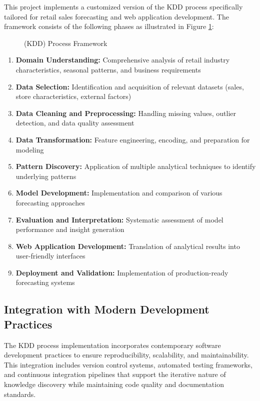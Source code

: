 This project implements a customized version of the KDD process specifically tailored for retail sales forecasting and web application development. The framework consists of the following phases as illustrated in Figure \ref{fig:kdd_process}:

\begin{figure}[H]
	\centering
	
	\caption{ (KDD) Process Framework}
	\label{fig:kdd_process}
\end{figure}

\begin{enumerate}
	\item \textbf{Domain Understanding:} Comprehensive analysis of retail industry characteristics, seasonal patterns, and business requirements
	\item \textbf{Data Selection:} Identification and acquisition of relevant datasets (sales, store characteristics, external factors)
	\item \textbf{Data Cleaning and Preprocessing:} Handling missing values, outlier detection, and data quality assessment
	\item \textbf{Data Transformation:} Feature engineering, encoding, and preparation for modeling
	\item \textbf{Pattern Discovery:} Application of multiple analytical techniques to identify underlying patterns
	\item \textbf{Model Development:} Implementation and comparison of various forecasting approaches
	\item \textbf{Evaluation and Interpretation:} Systematic assessment of model performance and insight generation
	\item \textbf{Web Application Development:} Translation of analytical results into user-friendly interfaces
	\item \textbf{Deployment and Validation:} Implementation of production-ready forecasting systems
\end{enumerate}

\subsection{Integration with Modern Development Practices}
\label{subsec:modern_integration}

The KDD process implementation incorporates contemporary software development practices to ensure reproducibility, scalability, and maintainability. This integration includes version control systems, automated testing frameworks, and continuous integration pipelines that support the iterative nature of knowledge discovery while maintaining code quality and documentation standards.

